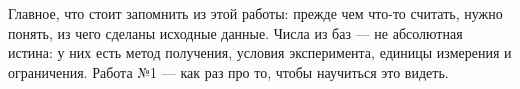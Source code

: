 \documentclass[11pt,a4paper]{article}
\begin{document}
\medskip
\noindent Главное, что стоит запомнить из этой работы: прежде чем что-то считать,
нужно понять, из чего сделаны исходные данные. Числа из баз --- не абсолютная
истина: у них есть метод получения, условия эксперимента, единицы измерения и
ограничения. Работа №1 --- как раз про то, чтобы научиться это видеть.
\end{document}
